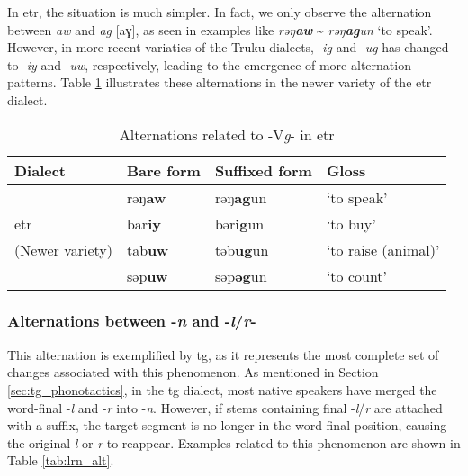 In \acl{etr}, the situation is much simpler. In fact, we only observe the alternation between \textit{aw} and \textit{ag} [aɣ], as seen in examples like \textit{rəŋ\textbf{aw}} \~{} \textit{rəŋ\textbf{ag}un} `to speak'. However, in more recent variaties of the Truku dialects, -\textit{ig} and -\textit{ug} has changed to -\textit{iy} and -\textit{uw}, respectively, leading to the emergence of more alternation patterns. Table \ref{tab:Vg_alt_etr} illustrates these alternations in the newer variety of the \acl{etr} dialect.

\begin{table}[!htbp]
\centering
\caption{Alternations related to -V\textit{g}- in \acl{etr}}
\label{tab:Vg_alt_etr}
\begin{tabular}{llll}
\hline
Dialect                   & Bare form      & Suffixed form    & Gloss      \\ \hline
                          & rəŋ\textbf{aw}  & rəŋ\textbf{ag}un & `to speak'          \\
        \acl{etr}         & bar\textbf{iy} & bər\textbf{ig}un & `to buy'            \\
     (Newer variety)      & tab\textbf{uw} & təb\textbf{ug}un & `to raise (animal)' \\
                          & səp\textbf{uw} & səp\textbf{əg}un & `to count'          \\ \hline
\end{tabular}
\end{table}

\subsubsection{Alternations between -\textit{n} and -\textit{l}/\textit{r}- }

This alternation is exemplified by \acl{tg}, as it represents the most complete set of changes associated with this phenomenon. As mentioned in Section \ref{sec:tg_phonotactics}, in the \acl{tg} dialect, most native speakers have merged the word-final -\textit{l} and -\textit{r} into -\textit{n}. However, if stems containing final -\textit{l}/\textit{r} are attached with a suffix, the target segment is no longer in the word-final position, causing the original \textit{l} or \textit{r} to reappear. Examples related to this phenomenon are shown in Table \ref{tab:lrn_alt}.

